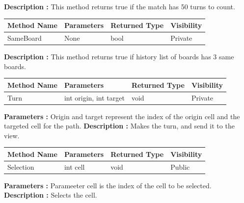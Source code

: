 \documentclass[12pt]{article}
\begin{document}
\textbf{Description :} This method returns true if the match has 50 turns to count.

\begin{table}[H]
    \begin{tabular}{|l|l|l|l|}
    \hline
    \rowcolor[HTML]{EFEFEF} 
    \cellcolor[HTML]{EFEFEF}\textbf{Method Name} & \textbf{Parameters}    & \textbf{Returned Type} & \textbf{Visibility} \\ \hline
    SameBoard                                    & None                   & bool                   & Private              \\ \hline
    \end{tabular}
\end{table}

\textbf{Description :} This method returns true if history list of boards has 3 same boards.

\begin{table}[H]
    \begin{tabular}{|l|l|l|l|}
    \hline
    \rowcolor[HTML]{EFEFEF} 
    \cellcolor[HTML]{EFEFEF}\textbf{Method Name} & \textbf{Parameters}    & \textbf{Returned Type} & \textbf{Visibility} \\ \hline
    Turn                                         & int origin, int target & void                   & Private             \\ \hline
    \end{tabular}
\end{table}

\textbf{Parameters :} Origin and target represent the index of the origin cell and the targeted cell for the path.
\textbf{Description :} Makes the turn, and send it to the view.

\begin{table}[H]
    \begin{tabular}{|l|l|l|l|}
    \hline
    \rowcolor[HTML]{EFEFEF} 
    \cellcolor[HTML]{EFEFEF}\textbf{Method Name} & \textbf{Parameters}    & \textbf{Returned Type} & \textbf{Visibility} \\ \hline
    Selection                                    & int cell               & void                   & Public             \\ \hline
    \end{tabular}
\end{table}

\textbf{Parameters :} Parameeter cell is the index of the cell to be selected.
\textbf{Description :} Selects the cell.
\end{document}
